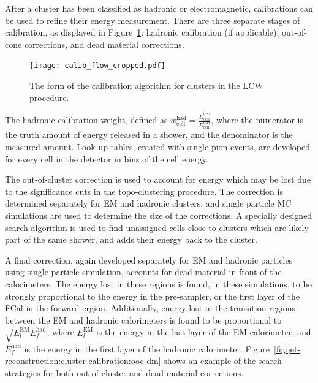 
After a cluster has been classified as hadronic or electromagnetic,  calibrations can be used to refine their energy measurement. There are three separate stages of calibration, as displayed in Figure~\ref{fig:jet-reconstruction:cluster-calibration:calib-flow}: hadronic calibration (if applicable), out-of-cone corrections, and dead material corrections.


\begin{figure}
\centering
\texttt{[image: calib\_flow\_cropped.pdf]}
\label{fig:jet-reconstruction:cluster-calibration:calib-flow}
\caption{The form of the calibration algorithm for clusters in the LCW procedure.}
\end{figure}


The hadronic calibration weight, defined as $w_\mathrm{cell}^\mathrm{had} = \frac{{E}^\mathrm{dep}_\mathrm{cell}}{E^\mathrm{EM}_\mathrm{cell}}$, where the numerator is the truth amount of energy released in a shower, and the denominator is the measured amount. Look-up tables, created with single pion events, are developed for every cell in the detector in bins of the cell energy.

The out-of-cluster correction is used to account for energy which may be lost due to the significance cuts in the topo-clustering procedure. The correction is determined separately for EM and hadronic clusters, and single particle MC simulations are used to determine the size of the corrections. A specially designed search algorithm is used to find unassigned cells close to clusters which are likely part of the same shower, and adds their energy back to the cluster.

A final correction, again developed separately for EM and hadronic particles using single particle simulation, accounts for dead material in front of the calorimeters. The energy lost in these regions is found, in these simulations, to be strongly proportional to the energy in the pre-sampler, or the first layer of the FCal in the forward ergion. Additionally, energy lost in the transition regions between the EM and hadronic calorimeters is found to be proportional to $\sqrt{E_l^\mathrm{EM} E_f^\mathrm{had}}$, where $E_l^\mathrm{EM}$ is the energy in the last layer of the EM calorimeter, and $E_f^\mathrm{had}$ is the energy in the first layer of the hadronic calorimeter. Figure~\ref{fig:jet-reconstruction:cluster-calibration:ooc-dm} shows an example of the search strategies for both out-of-cluster and dead material corrections. 

